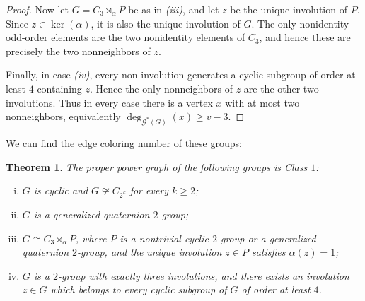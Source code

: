 \documentclass{article}
\newtheorem{theorem}{Theorem}[section]
\theoremstyle{definition}
\theoremstyle{indentclaim}
\theoremstyle{named}
\theoremstyle{named}
\begin{document}
\begin{proof}
Now let $G=C_3\rtimes_\alpha P$ be as in \textit{(iii)}, and let $z$ be the unique involution of $P$.
Since $z\in\ker(\alpha)$, it is also the unique involution of $G$. The only nonidentity odd-order elements are the two nonidentity elements of
$C_3$, and hence these are precisely the two nonneighbors of $z$.

Finally, in case \textit{(iv)}, every non-involution generates a cyclic subgroup of order at least
$4$ containing $z$. Hence the only nonneighbors of $z$ are the other two involutions.
Thus in every case there is a vertex $x$ with at most two nonneighbors, equivalently
$\deg_{\mathscr{G}^*(G)}(x)\geq v-3$.

\end{proof}



We can find the edge coloring number of these groups: 

\begin{theorem}\label{thm:proper}
The proper power graph of the following groups is Class \(1\):
\begin{enumerate}[i)]
    \item \(G\) is cyclic and $G \not\cong C_{2^{k}}$ for every $k\geq 2$; 

    \item \(G\) is a generalized quaternion \(2\)-group;

    \item $G \cong C_{3}\rtimes_{\alpha}P$,
    where \(P\) is a nontrivial cyclic \(2\)-group or a generalized
    quaternion \(2\)-group, and the unique involution \(z\in P\)
    satisfies \(\alpha(z)=1\);

    \item \(G\) is a \(2\)-group with exactly three involutions, and
    there exists an involution \(z\in G\) which belongs to every cyclic
    subgroup of \(G\) of order at least \(4\).
\end{enumerate}
\end{theorem}
\end{document}
